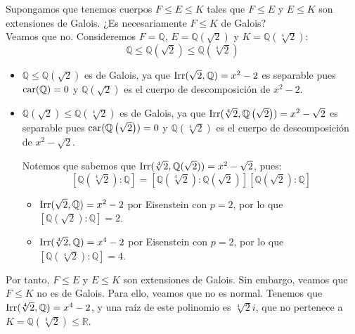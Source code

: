 \begin{ejercicio}
    Supongamos que tenemos cuerpos $F\leq E \leq K$ tales que $F\leq E$ y $E\leq K$ son extensiones de Galois. ¿Es necesariamente $F\leq K$ de Galois?\\

    Veamos que no. Consideremos $F = \mathbb{Q}$, $E = \mathbb{Q}\left(\sqrt{2}\right)$ y $K = \mathbb{Q}\left(\sqrt[4]{2}\right)$:
    \begin{equation*}
        \mathbb{Q}\leq \mathbb{Q}\left(\sqrt{2}\right) \leq \mathbb{Q}\left(\sqrt[4]{2}\right)
    \end{equation*}
    \begin{itemize}
        \item $\mathbb{Q}\leq \mathbb{Q}\left(\sqrt{2}\right)$ es de Galois, ya que $\operatorname{Irr}(\sqrt{2},\mathbb{Q}) = x^2-2$ es separable pues $\operatorname{car}(\mathbb{Q}) = 0$ y $\mathbb{Q}\left(\sqrt{2}\right)$ es el cuerpo de descomposición de $x^2-2$.
        \item $\mathbb{Q}\left(\sqrt{2}\right) \leq \mathbb{Q}\left(\sqrt[4]{2}\right)$ es de Galois, ya que $\operatorname{Irr}(\sqrt[4]{2},\mathbb{Q}\left(\sqrt{2}\right)) = x^2-\sqrt{2}$ es separable pues $\operatorname{car}(\mathbb{Q}\left(\sqrt{2}\right)) = 0$ y $\mathbb{Q}\left(\sqrt[4]{2}\right)$ es el cuerpo de descomposición de $x^2-\sqrt{2}$.
        
        Notemos que sabemos que $\operatorname{Irr}(\sqrt[4]{2},\mathbb{Q}(\sqrt{2})) = x^2-\sqrt{2}$, pues:
        \begin{equation*}
            \left[\mathbb{Q}\left(\sqrt[4]{2}\right):\mathbb{Q}\right] = \left[\mathbb{Q}\left(\sqrt[4]{2}\right):\mathbb{Q}\left(\sqrt{2}\right)\right]\left[\mathbb{Q}\left(\sqrt{2}\right):\mathbb{Q}\right]
        \end{equation*}
        \begin{itemize}
            \item $\operatorname{Irr}(\sqrt{2},\mathbb{Q}) = x^2-2$ por Eisenstein con $p=2$, por lo que $[\mathbb{Q}\left(\sqrt{2}\right):\mathbb{Q}] = 2$.
            \item $\operatorname{Irr}(\sqrt[4]{2},\mathbb{Q}) = x^4-2$ por Eisenstein con $p=2$, por lo que $[\mathbb{Q}\left(\sqrt[4]{2}\right):\mathbb{Q}] = 4$.
        \end{itemize}
    \end{itemize}

    Por tanto, $F\leq E$ y $E\leq K$ son extensiones de Galois. Sin embargo, veamos que $F\leq K$ no es de Galois. Para ello, veamos que no es normal. Tenemos que $\operatorname{Irr}(\sqrt[4]{2},\mathbb{Q}) = x^4-2$, y una raíz de este polinomio es $\sqrt[4]{2}i$, que no pertenece a $K = \mathbb{Q}\left(\sqrt[4]{2}\right)\leq \mathbb{R}$.
\end{ejercicio}


